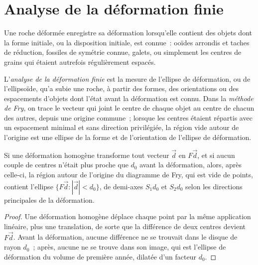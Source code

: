 \section{Analyse de la déformation finie}\label{sec:b3:structural-analysis:strain}

Une roche déformée enregistre sa déformation lorsqu'elle contient des objets dont la forme
initiale, ou la disposition initiale, est connue~: ooïdes arrondis et taches de réduction,
fossiles de symétrie connue, galets, ou simplement les centres de grains
qui étaient autrefois régulièrement espacés.

\begin{definition}\label{def:b3:structural-analysis:strain-analysis}
L'\emph{analyse de la déformation finie} est la mesure
de l'ellipse de déformation, ou de l'ellipsoïde, qu'a subie une roche, à partir des
formes, des orientations ou des espacements d'objets dont l'état avant la
déformation est connu. Dans la \emph{méthode de Fry}, on trace
le vecteur qui joint le centre de chaque objet au centre de chacun des autres, depuis
une origine commune~; lorsque les centres étaient répartis avec un espacement minimal et sans
direction privilégiée, la région vide autour de l'origine est une ellipse de la forme et
de l'orientation de l'ellipse de déformation.
\end{definition}

\begin{proposition}\label{prop:b3:structural-analysis:fry}
Si une déformation homogène transforme tout vecteur $\vec d$ en $F\vec d$, et si aucun couple
de centres n'était plus proche que $d_0$ avant la déformation, alors, après celle-ci, la région
autour de l'origine du diagramme de Fry, qui est vide de points, contient
l'ellipse $\{F\vec d : |\vec d| < d_0\}$, de demi-axes $S_1d_0$ et $S_2d_0$ selon les
directions principales de la déformation.
\end{proposition}

\begin{proof}
Une déformation homogène déplace chaque point par la même application linéaire, plus une
translation, de sorte que la différence de deux centres devient $F\vec d$. Avant la
déformation, aucune différence ne se trouvait dans le disque de rayon $d_0$~; après,
aucune ne se trouve dans son image, qui est l'ellipse de déformation du volume de première année, dilatée d'un facteur $d_0$.
\end{proof}

